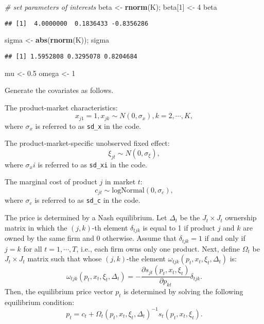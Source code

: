 \documentclass[
]{book}
\newenvironment{Shaded}{\begin{snugshade}}{\end{snugshade}}
\newcommand{\CommentTok}[1]{\textcolor[rgb]{0.56,0.35,0.01}{\textit{#1}}}
\newcommand{\DecValTok}[1]{\textcolor[rgb]{0.00,0.00,0.81}{#1}}
\newcommand{\FloatTok}[1]{\textcolor[rgb]{0.00,0.00,0.81}{#1}}
\newcommand{\FunctionTok}[1]{\textcolor[rgb]{0.13,0.29,0.53}{\textbf{#1}}}
\newcommand{\NormalTok}[1]{#1}
\newcommand{\OtherTok}[1]{\textcolor[rgb]{0.56,0.35,0.01}{#1}}
\begin{document}
\begin{Shaded}
\begin{Highlighting}[]
\CommentTok{\# set parameters of interests}
\NormalTok{beta }\OtherTok{\textless{}{-}} \FunctionTok{rnorm}\NormalTok{(K); }
\NormalTok{beta[}\DecValTok{1}\NormalTok{] }\OtherTok{\textless{}{-}} \DecValTok{4}
\NormalTok{beta}
\end{Highlighting}
\end{Shaded}

\begin{verbatim}
## [1]  4.0000000  0.1836433 -0.8356286
\end{verbatim}

\begin{Shaded}
\begin{Highlighting}[]
\NormalTok{sigma }\OtherTok{\textless{}{-}} \FunctionTok{abs}\NormalTok{(}\FunctionTok{rnorm}\NormalTok{(K)); sigma}
\end{Highlighting}
\end{Shaded}

\begin{verbatim}
## [1] 1.5952808 0.3295078 0.8204684
\end{verbatim}

\begin{Shaded}
\begin{Highlighting}[]
\NormalTok{mu }\OtherTok{\textless{}{-}} \FloatTok{0.5}
\NormalTok{omega }\OtherTok{\textless{}{-}} \DecValTok{1}
\end{Highlighting}
\end{Shaded}

Generate the covariates as follows.

The product-market characteristics:
\[
x_{j1} = 1, x_{jk} \sim N(0, \sigma_x), k = 2, \cdots, K,
\]
where \(\sigma_x\) is referred to as \texttt{sd\_x} in the code.

The product-market-specific unobserved fixed effect:
\[
\xi_{jt} \sim N(0, \sigma_\xi),
\]
where \(\sigma_xi\) is referred to as \texttt{sd\_xi} in the code.

The marginal cost of product \(j\) in market \(t\):
\[
c_{jt} \sim \text{logNormal}(0, \sigma_c),
\]
where \(\sigma_c\) is referred to as \texttt{sd\_c} in the code.

The price is determined by a Nash equilibrium. Let \(\Delta_t\) be the \(J_t \times J_t\) ownership matrix in which the \((j, k)\)-th element \(\delta_{tjk}\) is equal to 1 if product \(j\) and \(k\) are owned by the same firm and 0 otherwise. Assume that \(\delta_{tjk} = 1\) if and only if \(j = k\) for all \(t = 1, \cdots, T\), i.e., each firm owns only one product. Next, define \(\Omega_t\) be \(J_t \times J_t\) matrix such that whose \((j, k)\)-the element \(\omega_{tjk}(p_t, x_t, \xi_t, \Delta_t)\) is:
\[
\omega_{tjk}(p_t, x_t, \xi_t, \Delta_t) = - \frac{\partial s_{jt}(p_t, x_t, \xi_t)}{\partial p_{kt}} \delta_{tjk}.
\]
Then, the equilibrium price vector \(p_t\) is determined by solving the following equilibrium condition:
\[
p_t = c_t + \Omega_t(p_t, x_t, \xi_t, \Delta_t)^{-1} s_t(p_t, x_t, \xi_t).
\]
\end{document}
